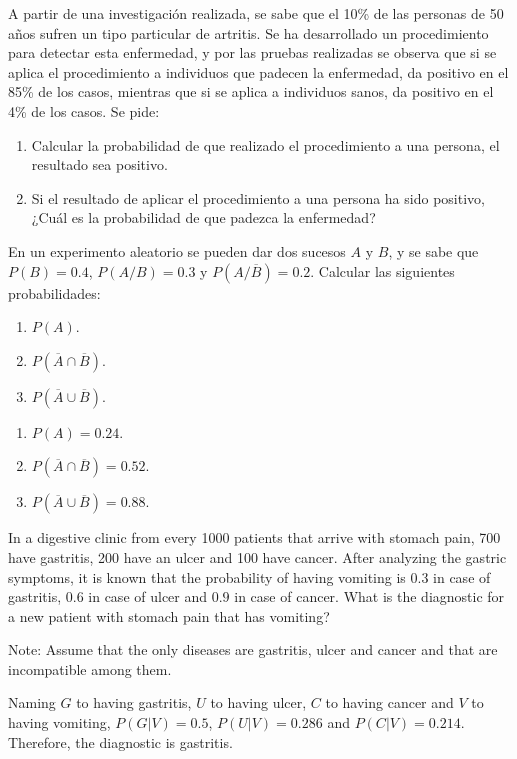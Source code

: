 {A partir de una investigación realizada, se sabe que el 10\% de las personas de 50 años sufren un tipo particular de
artritis.
Se ha desarrollado un procedimiento para detectar esta enfermedad, y por las pruebas realizadas se observa que si se
aplica el procedimiento a individuos que padecen la enfermedad, da positivo en el 85\% de los casos, mientras que
si se aplica a individuos sanos, da positivo en el 4\% de los casos.
Se pide:
\begin{enumerate}
\item  Calcular la probabilidad de que realizado el procedimiento a una persona, el resultado sea positivo.
\item  Si el resultado de aplicar el procedimiento a una persona ha sido positivo, ¿Cuál es la probabilidad de que
padezca la enfermedad?
\end{enumerate}
}
{}
{}


{En un experimento aleatorio se pueden dar dos sucesos $A$ y $B$, y se sabe que $P(B)=0.4$, $P(A/B)=0.3$ y
$P(A/\overline{B})=0.2$.
Calcular las siguientes probabilidades:
\begin{enumerate}
\item $P(A)$.
\item $P(\overline{A}\cap \overline{B})$.
\item $P(\overline{A}\cup \overline{B})$.
\end{enumerate}
}
{
\begin{enumerate}
\item $P(A)=0.24$.
\item $P(\overline{A}\cap \overline{B})=0.52$.
\item $P(\overline{A}\cup \overline{B})=0.88$.
\end{enumerate}
}
{}


{In a digestive clinic from every 1000 patients that arrive with stomach pain, 700 have gastritis,
200 have an ulcer and 100 have cancer.
After analyzing the gastric symptoms, it is known that the probability of having vomiting is $0.3$ in case of gastritis, $0.6$ in case of ulcer and $0.9$ in case of cancer. 
What is the diagnostic for a new patient with stomach pain that has vomiting?

Note: Assume that the only diseases are gastritis, ulcer and cancer and that are incompatible among them.
}
{Naming $G$ to having gastritis, $U$ to having ulcer, $C$ to having cancer and $V$ to having vomiting, $P(G|V)=0.5$, $P(U|V)=0.286$ and $P(C|V)=0.214$.
Therefore, the diagnostic is gastritis.}
{}


